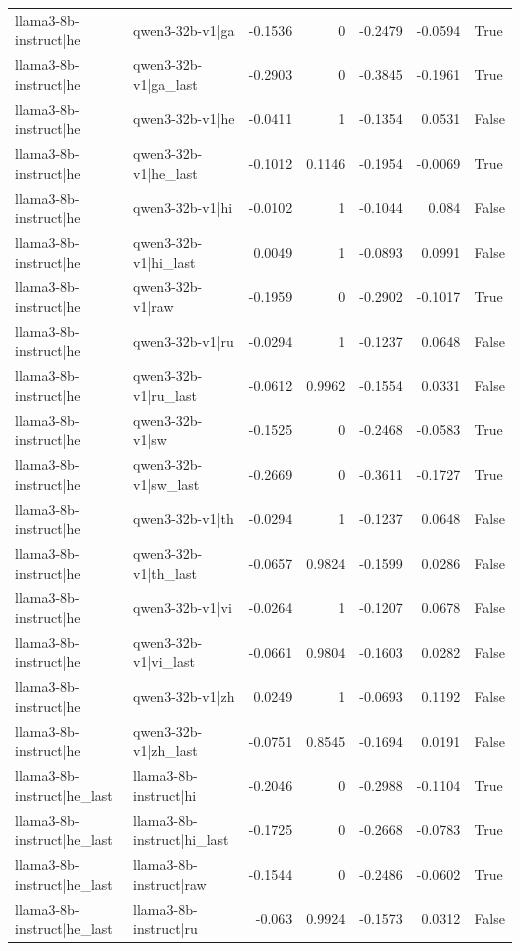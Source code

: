 \begin{table}
\begin{tabular}{l l r r r r l}
llama3-8b-instruct|he & qwen3-32b-v1|ga & -0.1536 & 0 & -0.2479 & -0.0594 & True \\
llama3-8b-instruct|he & qwen3-32b-v1|ga_last & -0.2903 & 0 & -0.3845 & -0.1961 & True \\
llama3-8b-instruct|he & qwen3-32b-v1|he & -0.0411 & 1 & -0.1354 & 0.0531 & False \\
llama3-8b-instruct|he & qwen3-32b-v1|he_last & -0.1012 & 0.1146 & -0.1954 & -0.0069 & True \\
llama3-8b-instruct|he & qwen3-32b-v1|hi & -0.0102 & 1 & -0.1044 & 0.084 & False \\
llama3-8b-instruct|he & qwen3-32b-v1|hi_last & 0.0049 & 1 & -0.0893 & 0.0991 & False \\
llama3-8b-instruct|he & qwen3-32b-v1|raw & -0.1959 & 0 & -0.2902 & -0.1017 & True \\
llama3-8b-instruct|he & qwen3-32b-v1|ru & -0.0294 & 1 & -0.1237 & 0.0648 & False \\
llama3-8b-instruct|he & qwen3-32b-v1|ru_last & -0.0612 & 0.9962 & -0.1554 & 0.0331 & False \\
llama3-8b-instruct|he & qwen3-32b-v1|sw & -0.1525 & 0 & -0.2468 & -0.0583 & True \\
llama3-8b-instruct|he & qwen3-32b-v1|sw_last & -0.2669 & 0 & -0.3611 & -0.1727 & True \\
llama3-8b-instruct|he & qwen3-32b-v1|th & -0.0294 & 1 & -0.1237 & 0.0648 & False \\
llama3-8b-instruct|he & qwen3-32b-v1|th_last & -0.0657 & 0.9824 & -0.1599 & 0.0286 & False \\
llama3-8b-instruct|he & qwen3-32b-v1|vi & -0.0264 & 1 & -0.1207 & 0.0678 & False \\
llama3-8b-instruct|he & qwen3-32b-v1|vi_last & -0.0661 & 0.9804 & -0.1603 & 0.0282 & False \\
llama3-8b-instruct|he & qwen3-32b-v1|zh & 0.0249 & 1 & -0.0693 & 0.1192 & False \\
llama3-8b-instruct|he & qwen3-32b-v1|zh_last & -0.0751 & 0.8545 & -0.1694 & 0.0191 & False \\
llama3-8b-instruct|he_last & llama3-8b-instruct|hi & -0.2046 & 0 & -0.2988 & -0.1104 & True \\
llama3-8b-instruct|he_last & llama3-8b-instruct|hi_last & -0.1725 & 0 & -0.2668 & -0.0783 & True \\
llama3-8b-instruct|he_last & llama3-8b-instruct|raw & -0.1544 & 0 & -0.2486 & -0.0602 & True \\
llama3-8b-instruct|he_last & llama3-8b-instruct|ru & -0.063 & 0.9924 & -0.1573 & 0.0312 & False \\

\end{tabular}
\end{table}
